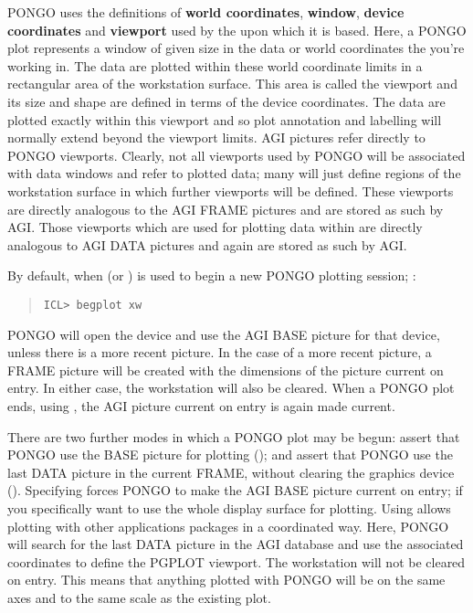 PONGO uses the definitions of {\bf world coordinates}, {\bf window},
{\bf device coordinates} and {\bf viewport} used by the
 upon which it is based.
Here, a PONGO plot represents a window of given size in the data or world
coordinates the you're working in.
The data are plotted within these world coordinate limits in a rectangular
area of the workstation surface.
This area is called the viewport and its size and shape are defined in terms of
the device coordinates.
The data are plotted exactly within this viewport and so plot annotation and
labelling will normally extend beyond the viewport limits.
AGI pictures refer directly to PONGO viewports.
Clearly, not all viewports used by PONGO will be associated with data windows
and refer to plotted data; many will just define regions of the workstation
surface in which further viewports will be defined.
These viewports are directly analogous to the AGI FRAME pictures and are
stored as such by AGI.
Those viewports which are used for plotting data within are directly analogous
to AGI DATA pictures and again are stored as such by AGI.

By default, when  (or ) is used to
begin a new PONGO plotting session; \eg:
\begin{quote}
\begin{verbatim}
ICL> begplot xw
\end{verbatim}
\end{quote}
PONGO will open the device and use the AGI BASE picture for that device, unless
there is a more recent picture.
In the case of a more recent picture, a FRAME picture will be created with the
dimensions of the picture current on entry.
In either case, the workstation will also be cleared.
When a PONGO plot ends, using , the AGI picture current on entry
is again made current.

There are two further modes in which a PONGO plot may be begun: assert
that PONGO use the BASE picture for plotting ();
and assert that PONGO use the last DATA picture in the
current FRAME, without clearing the graphics device ().  Specifying  forces PONGO to
make the AGI BASE picture current on entry; \ie if you specifically
want to use the whole display surface for plotting.
Using  allows plotting with other
applications packages in a coordinated way.  Here, PONGO will search
for the last DATA picture in the AGI database and use the associated
coordinates to define the PGPLOT viewport.  The workstation will not
be cleared on entry.  This means that anything plotted with PONGO will
be on the same axes and to the same scale as the existing plot.

